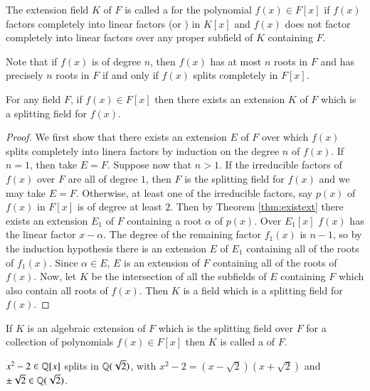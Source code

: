 \documentclass[12pt, a4paper, oneside, openright, titlepage]{book}
\begin{document}
\begin{defn}
    The extension field $K$ of $F$ is called a  for the polynomial $f(x) \in F[x]$ if $f(x)$ factors completely into linear factors (or ) in $K[x]$ and $f(x)$ does not factor completely into linear factors over any proper subfield of $K$ containing $F$.
\end{defn}

Note that if $f(x)$ is of degree $n$, then $f(x)$ has at most $n$ roots in $F$ and has precisely $n$ roots in $F$ if and only if $f(x)$ splits completely in $F[x]$.

\begin{thm}
    For any field $F$, if $f(x) \in F[x]$ then there exists an extension $K$ of $F$ which is a splitting field for $f(x)$.
\end{thm}
\begin{proof}
    We first show that there exists an extension $E$ of $F$ over which $f(x)$ splits completely into linera factors by induction on the degree $n$ of $f(x)$. If $n = 1$, then take $E = F$. Suppose now that $n > 1$. If the irreducible factors of $f(x)$ over $F$ are all of degree $1$, then $F$ is the splitting field for $f(x)$ and we may take $E= F$. Otherwise, at least one of the irreducible factors, say $p(x)$ of $f(x)$ in $F[x]$ is of degree at least $2$. Then by Theorem \ref{thm:existext} there exists an extension $E_1$ of $F$ containing a root $\alpha$ of $p(x)$. Over $E_1[x]$ $f(x)$ has the linear factor $x-\alpha$. The degree of the remaining factor $f_1(x)$ is $n-1$, so by the induction hypothesis there is an extension $E$ of $E_1$ containing all of the roots of $f_1(x)$. Since $\alpha \in E$, $E$ is an extension of $F$ containing all of the roots of $f(x)$. Now, let $K$ be the intersection of all the subfields of $E$ containing $F$ which also contain all roots of $f(x)$. Then $K$ is a field which is a splitting field for $f(x)$.
\end{proof}

\begin{defn}
    If $K$ is an algebraic extension of $F$ which is the splitting field over $F$ for a collection of polynomials $f(x) \in F[x]$ then $K$ is called a  of $F$.
\end{defn}

\begin{eg}
    $x^2 - 2 \in \mathbb Q[x]$ splits in $\mathbb Q(\sqrt{2})$, with $x^2-2 = (x-\sqrt{2})(x+\sqrt{2})$ and $\pm\sqrt{2}\in \mathbb Q(\sqrt{2})$.
\end{eg}
\end{document}
